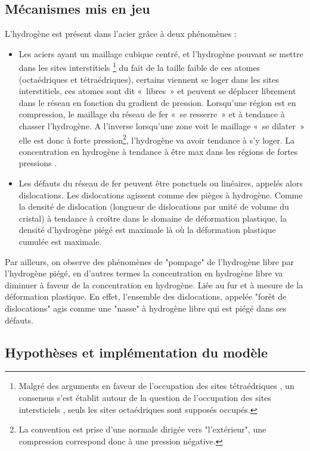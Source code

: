 \documentclass[a4paper, french, 11pt, draft]{article}
\begin{document}
    \subsection{Mécanismes mis en jeu}
    L'hydrogène est présent dans l'acier grâce à deux phénomènes :
    \begin{itemize}
        \item Les aciers ayant un maillage cubique centré, et l’hydrogène pouvant se mettre dans les sites interstitiels
        \footnote{ Malgré des arguments en faveur de l'occupation des sites tétraédriques \cite{sturges_interaction_1969}, un consensus s'est établit autour de la question de l'occupation des sites intersticiels \cite{sofronis_numerical_1989}, seuls les sites octaédriques sont supposés occupés.}
         du fait de la taille faible de  ces atomes (octaédriques et tétraédriques), certains viennent se loger dans les sites interstitiels, ces atomes sont dit « libres » et peuvent se déplacer librement dans le réseau en fonction du gradient de pression. Lorsqu’une région est en compression, le maillage du réseau de fer « se resserre » et à tendance à chasser l’hydrogène. A l’inverse lorsqu’une zone voit le maillage « se dilater » elle est donc à forte pression\footnote{La convention est prise d'une normale dirigée vers "l'extérieur", une compression correspond donc à une pression négative.}, l’hydrogène va avoir tendance à s’y loger. La concentration en hydrogène à tendance à être max dans les régions de fortes pressions \cite{degtyarenko_simulation_2016}.
        \item Les défauts du réseau de fer peuvent être ponctuels ou linéaires, appelés alors dislocations. Les dislocations agissent comme des pièges à hydrogène. Comme la densité de dislocation (longueur de dislocations par unité de volume du cristal) à tendance à croître dans le domaine de déformation plastique, la densité d’hydrogène piégé est maximale là où la déformation plastique cumulée est maximale\cite{oriani_diffusion_1970}.
    \end{itemize}
    Par ailleurs, on observe des phénomènes de "pompage" de l'hydrogène libre par l'hydrogène piégé, en d'autres termes la concentration en hydrogène libre va diminuer à faveur de la concentration en hydrogène. Liée au fur et à mesure de la déformation plastique. En effet, l'ensemble des dislocations, appelée "forêt de dislocations" agis comme une "nasse" à hydrogène libre qui est piégé dans ses défauts.

    \subsection{Hypothèses et implémentation du modèle}
\end{document}
